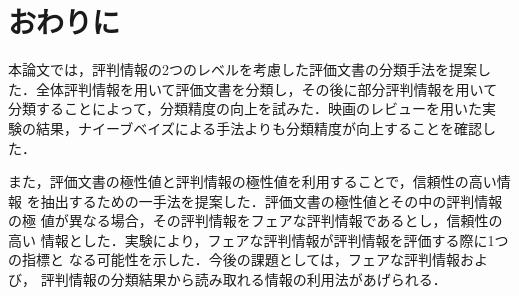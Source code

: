 \documentclass[japanese]{jnlp_1.3c}
\begin{document}
\section{おわりに}
本論文では，評判情報の2つのレベルを考慮した評価文書の分類手法を提案し
た．全体評判情報を用いて評価文書を分類し，その後に部分評判情報を用いて
分類することによって，分類精度の向上を試みた．映画のレビューを用いた実
験の結果，ナイーブベイズによる手法よりも分類精度が向上することを確認し
た．

また，評価文書の極性値と評判情報の極性値を利用することで，信頼性の高い情報
を抽出するための一手法を提案した．評価文書の極性値とその中の評判情報の極
値が異なる場合，その評判情報をフェアな評判情報であるとし，信頼性の高い
情報とした．実験により，フェアな評判情報が評判情報を評価する際に1つの指標と
なる可能性を示した．今後の課題としては，フェアな評判情報および，
評判情報の分類結果から読み取れる情報の利用法があげられる．
\end{document}
